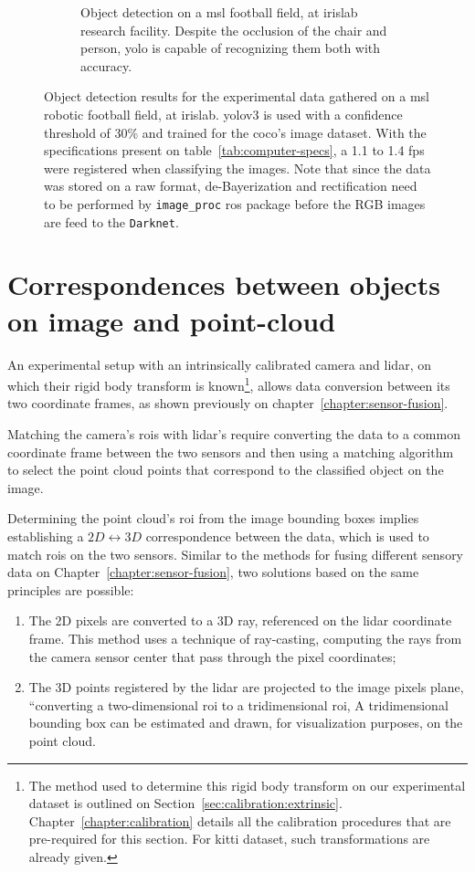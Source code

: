 \begin{figure}[ht]
\begin{subfigure}[t]{0.45\textwidth}
		\caption{Object detection on a \ac{msl} football field, at \ac{irislab} research facility. Despite the occlusion of the chair and person, \ac{yolo} is capable of recognizing them both with accuracy.}
		\label{fig:experimental-yolo-1}
	\end{subfigure}
	\caption{Object detection results for the experimental data gathered on a \ac{msl} robotic football field, at \ac{irislab}. \ac{yolo}v3 is used with a confidence threshold of 30\% and trained for the \ac{coco}'s image dataset. With the specifications present on table~\ref{tab:computer-specs}, a 1.1 to 1.4 \ac{fps} were registered when classifying the images. Note that since the data was stored on a raw format, de-Bayerization and rectification need to be performed by \texttt{image\_proc} \ac{ros} package before the RGB images are feed to the \texttt{Darknet}.}
	\label{fig:experimental-object-detection}
\end{figure}


\section{Correspondences between objects on image and point-cloud}
An experimental setup with an intrinsically calibrated camera and \ac{lidar}, on which their rigid body transform is known\footnote{The method used to determine this rigid body transform on our experimental dataset is outlined on Section~\ref{sec:calibration:extrinsic}. Chapter~\ref{chapter:calibration} details all the calibration procedures that are pre-required for this section. For \ac{kitti} dataset, such transformations are already given.}, allows data conversion between its two coordinate frames, as shown previously on chapter~\ref{chapter:sensor-fusion}. 

Matching the camera's \acp{roi} with \ac{lidar}'s require converting the data to a common coordinate frame between the two sensors and then using a matching algorithm to select the point cloud points that correspond to the classified object on the image.

Determining the point cloud's \ac{roi} from the image bounding boxes implies establishing a $2D \leftrightarrow 3D$ correspondence between the data, which is used to match \acp{roi} on the two sensors. Similar to the methods for fusing different sensory data on Chapter~\ref{chapter:sensor-fusion}, two solutions based on the same principles are possible:

\begin{enumerate}
	\item The 2D pixels are converted to a 3D ray, referenced on the \ac{lidar} coordinate frame. This method uses a technique of ray-casting, computing the rays from the camera sensor center that pass through the pixel coordinates;
	\item The 3D points registered by the \ac{lidar} are projected to the image pixels plane, ``converting a two-dimensional \ac{roi} to a tridimensional \ac{roi}, A tridimensional bounding box can be estimated and drawn, for visualization purposes, on the point cloud. 
\end{enumerate}

